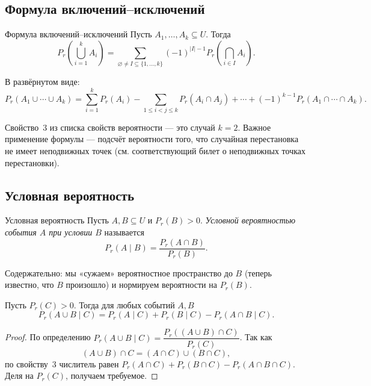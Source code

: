 \subsection{Формула включений--исключений}

\begin{Theorem}{Формула включений--исключений}{}
	Пусть \(A_1,\dots,A_k\subseteq U\). Тогда
	\[
	P_r\!\left(\bigcup_{i=1}^k A_i\right)
	=
	\sum_{\varnothing\neq I\subseteq \{1,\dots,k\}}
	(-1)^{|I|-1}
	P_r\!\left(\bigcap_{i\in I} A_i\right).
	\]
\end{Theorem}

В развёрнутом виде:
\[
P_r(A_1\cup\cdots\cup A_k)
=\sum_{i=1}^k P_r(A_i)
-\sum_{1\le i<j\le k}P_r(A_i\cap A_j)
+\cdots
+(-1)^{k-1}P_r(A_1\cap\cdots\cap A_k).
\]

\begin{Remark}{}{}
	Свойство~3 из списка свойств вероятности — это случай $k=2$. Важное применение формулы — подсчёт вероятности того, что случайная перестановка не имеет неподвижных точек (см. соответствующий билет о неподвижных точках перестановки).
\end{Remark}

\subsection{Условная вероятность}

\begin{Definition}{Условная вероятность}{}
	Пусть \(A,B\subseteq U\) и \(P_r(B)>0\). \textit{Условной вероятностью события \(A\) при условии \(B\)} называется
	\[
	P_r(A\mid B)=\frac{P_r(A\cap B)}{P_r(B)}.
	\]
\end{Definition}

\begin{Remark}{}{}
	Содержательно: мы «сужаем» вероятностное пространство до $B$ (теперь известно, что $B$ произошло) и нормируем вероятности на $P_r(B)$.
\end{Remark}

\begin{Statement}{}{}
	Пусть \(P_r(C)>0\). Тогда для любых событий \(A,B\)
	\[
	P_r(A\cup B\mid C)
	=
	P_r(A\mid C)+P_r(B\mid C)-P_r(A\cap B\mid C).
	\]
\end{Statement}

\begin{proof}
	По определению $P_r(A\cup B\mid C)=\dfrac{P_r((A\cup B)\cap C)}{P_r(C)}$. Так как
	\[
	(A\cup B)\cap C=(A\cap C)\cup(B\cap C),
	\]
	по свойству~3 числитель равен $P_r(A\cap C)+P_r(B\cap C)-P_r(A\cap B\cap C)$. Деля на $P_r(C)$, получаем требуемое.
\end{proof}

